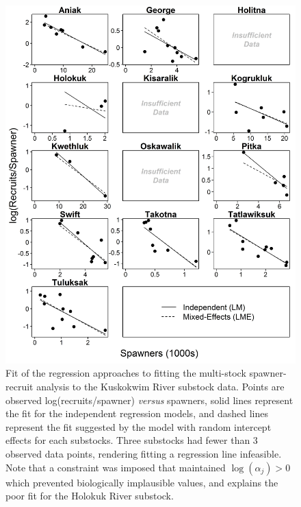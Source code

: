 \documentclass[12pt,]{book}
\theoremstyle{definition}
\theoremstyle{definition}
\theoremstyle{definition}
\theoremstyle{remark}
\begin{document}
\clearpage
\pagestyle{empty}

\begin{figure}
  \centering
  \includegraphics{img/Ch4/RPS-v-S.jpg}
  \caption{Fit of the regression approaches to fitting the multi-stock spawner-recruit analysis to the Kuskokwim River substock data. Points are observed log(recruits/spawner) \textit{versus} spawners, solid lines represent the fit for the independent regression models, and dashed lines represent the fit suggested by the model with random intercept effects for each substocks. Three substocks had fewer than 3 observed data points, rendering fitting a regression line infeasible. Note that a constraint was imposed that maintained $\log(\alpha_{j}) > 0$ which prevented biologically implausible values, and explains the poor fit for the Holokuk River substock.}
  \label{fig:rps-v-s}
\end{figure}

\clearpage
\end{document}
